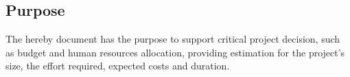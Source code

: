\subsection{Purpose}

The hereby document has the purpose to support critical project decision, such as budget and human resources allocation, providing estimation for the project's size, the effort required, expected costs and duration. 
